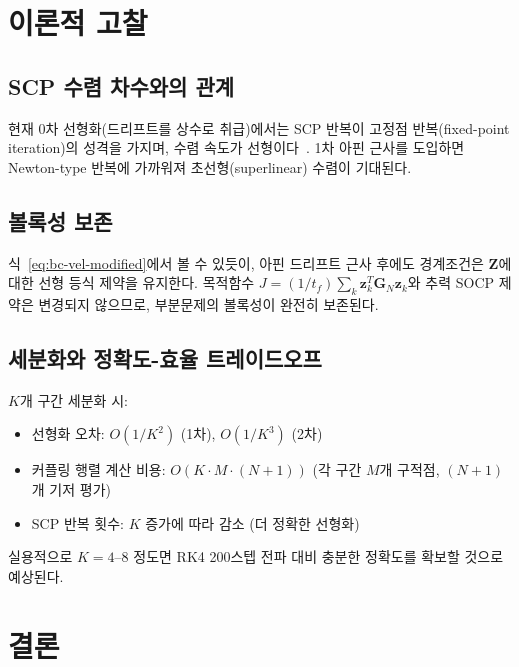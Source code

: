 \documentclass[11pt]{article}
\begin{document}
\section{이론적 고찰}
\label{sec:theory}

\subsection{SCP 수렴 차수와의 관계}

현재 0차 선형화(드리프트를 상수로 취급)에서는 SCP 반복이 고정점 반복(fixed-point iteration)의
성격을 가지며, 수렴 속도가 선형이다~\cite{report008}.
1차 아핀 근사를 도입하면 Newton-type 반복에 가까워져
초선형(superlinear) 수렴이 기대된다.

\subsection{볼록성 보존}

식~\eqref{eq:bc-vel-modified}에서 볼 수 있듯이, 아핀 드리프트 근사 후에도
경계조건은 $\mathbf{Z}$에 대한 선형 등식 제약을 유지한다.
목적함수 $J = (1/t_f)\sum_k \mathbf{z}_k^T\mathbf{G}_N\mathbf{z}_k$와
추력 SOCP 제약은 변경되지 않으므로,
부분문제의 볼록성이 완전히 보존된다.

\subsection{세분화와 정확도-효율 트레이드오프}

$K$개 구간 세분화 시:
\begin{itemize}
  \item 선형화 오차: $O(1/K^2)$ (1차), $O(1/K^3)$ (2차)
  \item 커플링 행렬 계산 비용: $O(K \cdot M \cdot (N+1))$
        (각 구간 $M$개 구적점, $(N+1)$개 기저 평가)
  \item SCP 반복 횟수: $K$ 증가에 따라 감소 (더 정확한 선형화)
\end{itemize}

실용적으로 $K = 4$--$8$ 정도면 RK4 200스텝 전파 대비
충분한 정확도를 확보할 것으로 예상된다.

\section{결론}
\label{sec:conclusion}
\end{document}
